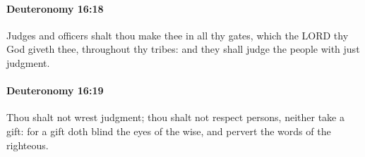 		\paragraph{Deuteronomy 16:18} %
			\label{DEUTERONOMY-16-18}

			Judges and officers shalt thou make thee in all thy gates, which the LORD thy God giveth thee, throughout thy tribes: and they shall judge the people with just judgment.


		\paragraph{Deuteronomy 16:19} %
			\label{DEUTERONOMY-16-19}

			Thou shalt not wrest judgment; thou shalt not respect persons, neither take a gift: for a gift doth blind the eyes of the wise, and pervert the words of the righteous.


